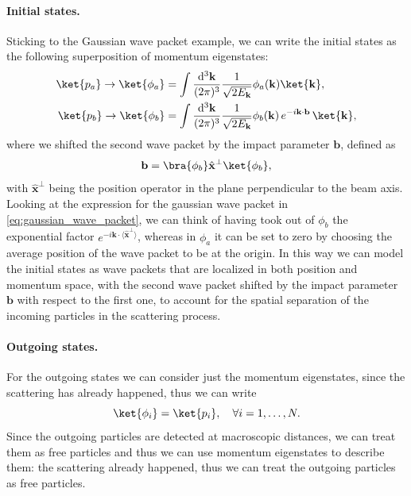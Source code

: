 \paragraph{Initial states.} Sticking to the Gaussian wave packet example, we can write the initial states as the following superposition of momentum eigenstates:
\[
    \begin{aligned}
        \ket{p_a} \to \ket{\phi_a} & = \int \frac{\mathrm{d}^3 \mathbf{k}}{(2 \pi)^3} \frac{1}{\sqrt{2 E_{\mathbf{k}}}} \phi_a (\mathbf{k})\ket{\mathbf{k}},                                           \\
        \ket{p_b} \to \ket{\phi_b} & = \int \frac{\mathrm{d}^3 \mathbf{k}}{(2 \pi)^3} \frac{1}{\sqrt{2 E_{\mathbf{k}}}} \phi_b (\mathbf{k}) \, e^{-i \mathbf{k} \cdot \mathbf{b}} \, \ket{\mathbf{k}},
    \end{aligned}
\]
where we shifted the second wave packet by the impact parameter \(\mathbf{b}\), defined as
\[
    \mathbf{b} = \bra{\phi_b} \hat{\mathbf{x}}^{\bot} \ket{\phi_b},
\]
with \(\hat{\mathbf{x}}^{\bot}\) being the position operator in the plane perpendicular to the beam axis. Looking at the expression for the gaussian wave packet in \eqref{eq:gaussian_wave_packet}, we can think of having took out of \(\phi_b\) the exponential factor \(e^{-i \mathbf{k} \cdot \langle \hat{\mathbf{x}}^{\bot} \rangle}\), whereas in \(\phi_a\) it can be set to zero by choosing the average position of the wave packet to be at the origin. In this way we can model the initial states as wave packets that are localized in both position and momentum space, with the second wave packet shifted by the impact parameter \(\mathbf{b}\) with respect to the first one, to account for the spatial separation of the incoming particles in the scattering process.

\paragraph{Outgoing states.} For the outgoing states we can consider just the momentum eigenstates, since the scattering has already happened, thus we can write
\[
    \ket{\phi_i} = \ket{p_i}, \quad \forall i = 1, \dots, N.
\]
Since the outgoing particles are detected at macroscopic distances, we can treat them as free particles and thus we can use momentum eigenstates to describe them: the scattering already happened, thus we can treat the outgoing particles as free particles.

